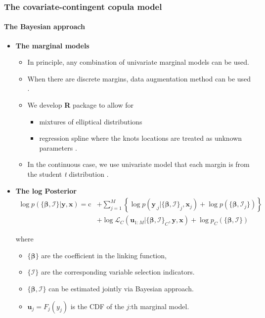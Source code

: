 \documentclass{beamer}
\begin{document}
\begin{frame}[allowframebreaks]
  \frametitle{The covariate-contingent copula model}
  \framesubtitle{The Bayesian approach}
  \begin{itemize}
  \item \textbf{The marginal models}
    \begin{itemize}
    \item In principle, any combination of univariate marginal models can be
      used.
    \item When there are discrete margins, data augmentation method can be used
      {\color{blue}\citep{smith2012estimation}}.

    \item We develop \textbf{R} package to allow for
      \begin{itemize}
      \item mixtures of elliptical distributions {\color{blue}\citep{li2010flexible}}
      \item regression spline where the knots locations are treated as unknown parameters
        {\color{blue}\citep{li2013efficient}}.
      \end{itemize}


    \item In the continuous case, we use univariate model that each margin is
      from the student \emph{t} distribution .
    \end{itemize}

  \item \textbf{The log Posterior}
    \[
    \begin{split}\log p(\{\bm{\beta},\bm{\mathcal{I}}\}|\bm{y},\bm{x})=
      \mathrm{c}&+\sum\nolimits _{j=1}^{M}\left\{\log
        p(\bm{y}_{.j}|\{\bm{\beta},\bm{\mathcal{I}}\}_{j},\bm{x}_{j}) + \log p(\{\bm{\beta},\bm{\mathcal{I}}_j\}) \right\}\\
      & +\log\mathcal{L}_{C}(\bm{u}_{1:M}|\{\bm{\beta},\bm{\mathcal{I}}\}_{C},\bm{y},\bm{x})+
      \log p_C(\{\bm{\beta},\bm{\mathcal{I}}\})
    \end{split}
    \]

    where
    \begin{itemize}
    \item $\{\bm{\beta}\}$ are the coefficient in the linking function,
    \item $\{\bm{\mathcal{I}}\}$ are the corresponding variable selection indicators.
    \item $\{\bm{\beta},\bm{\mathcal{I}}\}$ can be estimated jointly via Bayesian approach.
    \item $\bm{u}_{j}=F_{j}(y_{j})$ is the CDF of the $j$:th marginal model.
    \end{itemize}


\end{itemize}
\end{frame}
\end{document}
